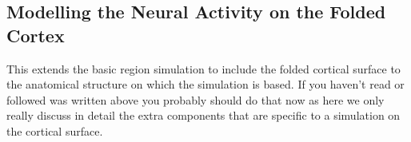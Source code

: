 \documentclass{tufte-handout}
\newenvironment{simulation}{%
  \def\FrameCommand{%
    \hspace{1pt}%
    {\color{ForestGreen}\vrule width 2pt}%
    {\color{simulationshade}\vrule width 4pt}%
    \colorbox{simulationshade}%
  }%
  \MakeFramed{\advance\hsize-\width\FrameRestore}%
  \noindent\hspace{-4.55pt}%
  \begin{adjustwidth}{}{7pt}%
  \vspace{2pt}\vspace{2pt}%
}
{%
  \vspace{2pt}\end{adjustwidth}\endMakeFramed%
}
\begin{document}
%
%
%
%
%

\newpage
\subsection{Modelling the Neural Activity on the Folded Cortex}\label{sec:surface_simulations}

This extends the basic region simulation to include the folded cortical surface to the anatomical structure on which the simulation is based. If you haven't read or followed was written above you probably should do that now as here we only really discuss in detail the extra components that are specific to a simulation on the cortical surface.
\end{document}
